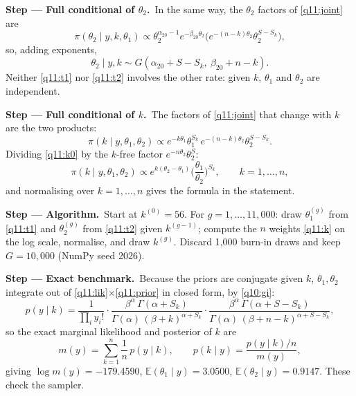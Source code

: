 \documentclass[11pt,a4paper]{article}
\numberwithin{equation}{questao}   %
\newcommand{\passo}[2]{\par\smallskip\noindent\textbf{Step --- #1.}~#2}
\newcommand{\E}{\mathbb{E}}
\newcommand{\1}{\mathbf{1}}
\begin{document}
\begin{sol}
\passo{Full conditional of $\theta_2$}{In the same way, the $\theta_2$ factors of \eqref{q11:joint}
are}
\[
\pi(\theta_2\mid y,k,\theta_1)\propto\theta_2^{\alpha_{20}-1}e^{-\beta_{20}\theta_2}\big(e^{-(n-k)\theta_2}\theta_2^{S-S_k}\big),
\]
so, adding exponents,
\begin{equation}\label{q11:t2}
\theta_2\mid y,k\sim G(\alpha_{20}+S-S_k,\ \beta_{20}+n-k).
\end{equation}
Neither \eqref{q11:t1} nor \eqref{q11:t2} involves the other rate: given $k$, $\theta_1$ and $\theta_2$
are independent.

\passo{Full conditional of $k$}{The factors of \eqref{q11:joint} that change with $k$ are the two
products:}
\begin{equation}\label{q11:k0}
\pi(k\mid y,\theta_1,\theta_2)\propto e^{-k\theta_1}\theta_1^{S_k}\,e^{-(n-k)\theta_2}\theta_2^{S-S_k}.
\end{equation}
Dividing \eqref{q11:k0} by the $k$-free factor $e^{-n\theta_2}\theta_2^{S}$:
\begin{equation}\label{q11:k}
\pi(k\mid y,\theta_1,\theta_2)\propto e^{k(\theta_2-\theta_1)}\Big(\frac{\theta_1}{\theta_2}\Big)^{S_k},
\qquad k=1,\dots,n,
\end{equation}
and normalising over $k=1,\dots,n$ gives the formula in the statement.

\passo{Algorithm}{Start at $k^{(0)}=56$. For $g=1,\dots,11{,}000$: draw $\theta_1^{(g)}$ from
\eqref{q11:t1} and $\theta_2^{(g)}$ from \eqref{q11:t2} given $k^{(g-1)}$; compute the $n$ weights
\eqref{q11:k} on the log scale, normalise, and draw $k^{(g)}$. Discard 1{,}000 burn-in draws and keep
$G=10{,}000$ (NumPy seed 2026).}

\passo{Exact benchmark}{Because the priors are conjugate given $k$, $\theta_1,\theta_2$ integrate out
of \eqref{q11:lik}$\times$\eqref{q11:prior} in closed form, by \eqref{q10:gi}:}
\begin{equation}\label{q11:pyk}
p(y\mid k)=\frac{1}{\prod_iy_i!}\cdot\frac{\beta^\alpha\,\Gamma(\alpha+S_k)}{\Gamma(\alpha)\,(\beta+k)^{\alpha+S_k}}
\cdot\frac{\beta^\alpha\,\Gamma(\alpha+S-S_k)}{\Gamma(\alpha)\,(\beta+n-k)^{\alpha+S-S_k}} ,
\end{equation}
so the exact marginal likelihood and posterior of $k$ are
\begin{equation}\label{q11:exact}
m(y)=\sum_{k=1}^n\frac1n\,p(y\mid k),\qquad p(k\mid y)=\frac{p(y\mid k)/n}{m(y)},
\end{equation}
giving $\log m(y)=-179.4590$, $\E(\theta_1\mid y)=3.0500$, $\E(\theta_2\mid y)=0.9147$. These check the
sampler.


\end{sol}
\end{document}
